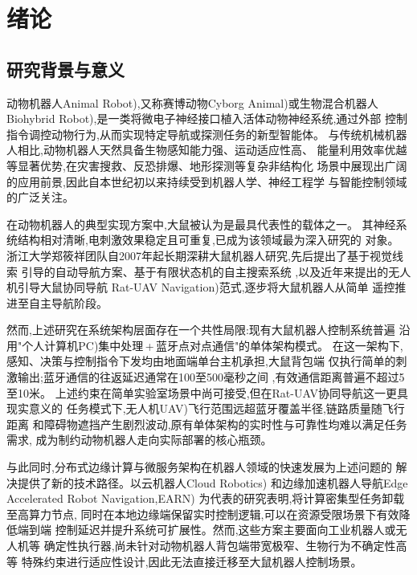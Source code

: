

\chapter{绪论}
\section{研究背景与意义}
动物机器人Animal Robot),又称赛博动物Cyborg Animal)或生物混合机器人
Biohybrid Robot),是一类将微电子神经接口植入活体动物神经系统,通过外部
控制指令调控动物行为,从而实现特定导航或探测任务的新型智能体。
与传统机械机器人相比,动物机器人天然具备生物感知能力强、运动适应性高、
能量利用效率优越等显著优势,在灾害搜救、反恐排爆、地形探测等复杂非结构化
场景中展现出广阔的应用前景,因此自本世纪初以来持续受到机器人学、神经工程学
与智能控制领域的广泛关注\cite{talwar2002rat}。
 
在动物机器人的典型实现方案中,大鼠被认为是最具代表性的载体之一。
其神经系统结构相对清晰,电刺激效果稳定且可重复,已成为该领域最为深入研究的
对象\cite{zheng2013rat}。
浙江大学郑筱祥团队自2007年起长期深耕大鼠机器人研究,先后提出了基于视觉线索
引导的自动导航方案\cite{wang2015visual}、基于有限状态机的自主搜索系统
\cite{zheng2023fsm},以及近年来提出的无人机引导大鼠协同导航
Rat-UAV Navigation)范式\cite{zheng2024ratuav},逐步将大鼠机器人从简单
遥控推进至自主导航阶段。
 
然而,上述研究在系统架构层面存在一个共性局限:现有大鼠机器人控制系统普遍
沿用"个人计算机PC)集中处理\,+\,蓝牙点对点通信"的单体架构模式。
在这一架构下,感知、决策与控制指令下发均由地面端单台主机承担,大鼠背包端
仅执行简单的刺激输出;蓝牙通信的往返延迟通常在100至500毫秒之间
\cite{zhang2019bci},有效通信距离普遍不超过5至10米\cite{feng2007remote}。
上述约束在简单实验室场景中尚可接受,但在Rat-UAV协同导航这一更具现实意义的
任务模式下,无人机UAV)飞行范围远超蓝牙覆盖半径,链路质量随飞行距离
和障碍物遮挡产生剧烈波动,原有单体架构的实时性与可靠性均难以满足任务需求,
成为制约动物机器人走向实际部署的核心瓶颈。
 
与此同时,分布式边缘计算与微服务架构在机器人领域的快速发展为上述问题的
解决提供了新的技术路径。以云机器人Cloud Robotics)\cite{kehoe2015cloud}
和边缘加速机器人导航Edge Accelerated Robot Navigation,EARN)
\cite{li2025earn}为代表的研究表明,将计算密集型任务卸载至高算力节点,
同时在本地边缘端保留实时控制逻辑,可以在资源受限场景下有效降低端到端
控制延迟并提升系统可扩展性。然而,这些方案主要面向工业机器人或无人机等
确定性执行器,尚未针对动物机器人背包端带宽极窄、生物行为不确定性高等
特殊约束进行适应性设计,因此无法直接迁移至大鼠机器人控制场景。
 
